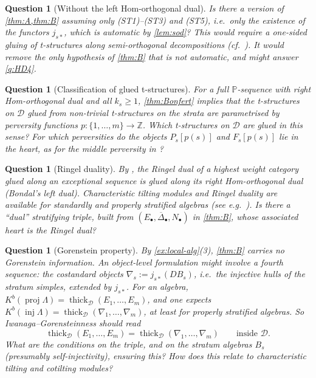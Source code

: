 \documentclass[11pt,reqno]{amsart}
\theoremstyle{plain}
\newtheorem{question}[theorem]{Question}
\theoremstyle{definition}
\theoremstyle{remark}
\newcommand{\proj}{\operatorname{proj}}
\newcommand{\Kb}{K^b}
\newcommand{\thick}[2][\cD]{\operatorname{thick}_{#1}(#2)}
\newcommand{\Deltabar}{\overline{\Delta}}
\newcommand{\cD}{\mathcal{D}}
\begin{document}
\begin{question}[Without the left Hom-orthogonal dual]
Is there a version of \cref{thm:A,thm:B} assuming only (ST1)--(ST3) and (ST5), i.e.\ only the existence of the functors $j_{s*}$, which is automatic by \cref{lem:sod}? This would require a one-sided gluing of t-structures along semi-orthogonal decompositions (cf.\ \cite{CP10}). It would remove the only hypothesis of \cref{thm:B} that is not automatic, and might answer \cref{q:HD4}.
\end{question}

\begin{question}[Classification of glued t-structures]\label{q:classification}
For a full $\mathbb{P}$-sequence with right Hom-orthogonal dual and all $k_s\ge1$, \cref{thm:Bonfert} implies that the t-structures on $\cD$ glued from non-trivial t-structures on the strata are parametrised by perversity functions $p\colon\{1,\dots,m\}\to\mathbb{Z}$. Which t-structures on $\cD$ are glued in this sense? For which perversities do the objects $P_s[p(s)]$ and $F_s[p(s)]$ lie in the heart, as for the middle perversity in \cite[\S5.1]{BB26}?
\end{question}

\begin{question}[Ringel duality]
By \cite[Thm.~3.2]{BB26}, the Ringel dual of a highest weight category glued along an exceptional sequence is glued along its right Hom-orthogonal dual (Bondal's left dual). Characteristic tilting modules and Ringel duality are available for standardly and properly stratified algebras (see e.g.\ \cite{AHLU00}). Is there a ``dual'' stratifying triple, built from $(E_\bullet,\Deltabar_\bullet,N_\bullet)$ in \cref{thm:B}, whose associated heart is the Ringel dual?
\end{question}

\begin{question}[Gorenstein property]\label{q:gorenstein}
By \cref{ex:local-alg}(3), \cref{thm:B} carries no Gorenstein information. An object-level formulation might involve a fourth sequence: the costandard objects $\nabla_s:=j_{s*}(DB_s)$, i.e.\ the injective hulls of the stratum simples, extended by $j_{s*}$. For an algebra, $\Kb(\proj\Lambda)=\thick{E_1,\dots,E_m}$, and one expects $\Kb(\operatorname{inj}\Lambda)=\thick{\nabla_1,\dots,\nabla_m}$, at least for properly stratified algebras. So Iwanaga--Gorensteinness should read
\[\thick{E_1,\dots,E_m}=\thick{\nabla_1,\dots,\nabla_m}\qquad\text{inside }\cD.\]
What are the conditions on the triple, and on the stratum algebras $B_s$ (presumably self-injectivity), ensuring this? How does this relate to characteristic tilting and cotilting modules?
\end{question}
\end{document}
